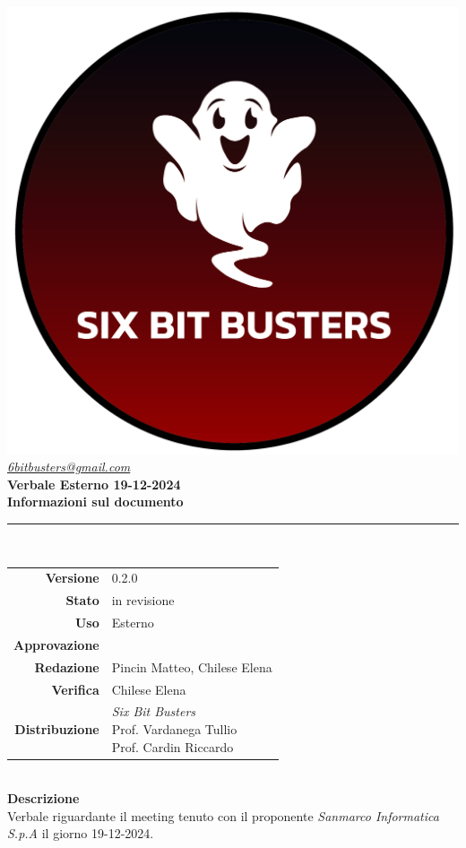 \thispagestyle{empty}
\renewcommand{\arraystretch}{1.3}


\begin{titlepage}
	\begin{center}
		
	\includegraphics[scale = 0.7]{template/images/logo-circle.png}
	\\[1cm]
	\href{mailto:6bitbusters@gmail.com}		      	
	{\large{\textit{6bitbusters@gmail.com} } }\\[1cm]
	
	\Huge \textbf{Verbale Esterno 19-12-2024} \\[1cm]

	\large \textbf{Informazioni sul documento} \\
	\rule{0.6\textwidth}{0.4pt}
	\\[0.5cm]
	\begin{tabular}{r|l}
		\textbf{Versione} & 0.2.0\\
		\textbf{Stato} & in revisione\\
		\textbf{Uso} & Esterno\\                         
		\textbf{Approvazione} & \\                      
		\textbf{Redazione} & Pincin Matteo, Chilese Elena\\ 
		\textbf{Verifica} & Chilese Elena\\                         
		\textbf{Distribuzione} & \parbox[t]{5cm}{ \textit{Six Bit Busters} \\ Prof. Vardanega Tullio 
	 \\ Prof. Cardin Riccardo}
	\end{tabular}	
	\\[1.2cm]

	\large \textbf{Descrizione} \\
	Verbale riguardante il meeting tenuto con il proponente \textit{Sanmarco Informatica S.p.A} il giorno 19-12-2024.
	
	\end{center}
\end{titlepage}
